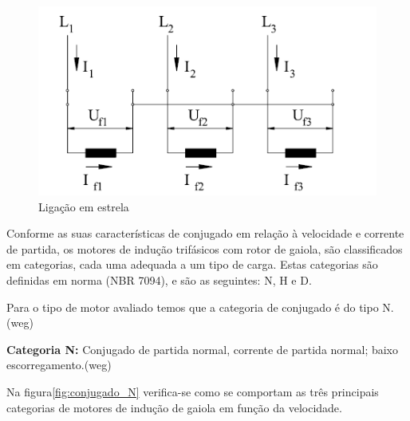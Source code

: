\begin{figure}[h!]
\centering
\includegraphics[scale=0.8]{figuras/ESTRELA.png}
\caption{Ligação em estrela}
\label{fig:ESTRELA}
\end{figure}

Conforme as suas características de conjugado em relação à velocidade e corrente de partida, os motores de indução trifásicos com rotor de gaiola, são classificados em categorias, cada uma adequada a um tipo de carga. Estas categorias são definidas em norma (NBR 7094), e são as seguintes: N, H e D. 

Para o tipo de motor avaliado temos que a categoria de conjugado é do tipo N. (weg)

\textbf{Categoria N:} Conjugado de partida normal, corrente de partida normal; baixo escorregamento.(weg)

Na figura\ref{fig:conjugado_N} verifica-se como se comportam as três principais categorias de motores de indução de gaiola em função da velocidade.

